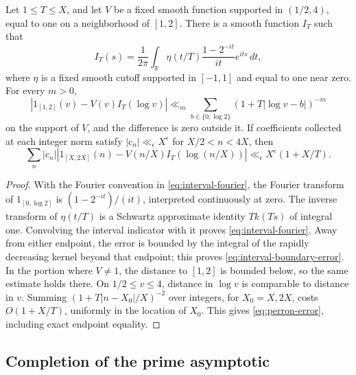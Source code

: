 \begin{lemma}
\label{lem:perron-truncation}
Let \(1\le T\le X\), and let \(V\) be a fixed smooth function
supported in \((1/2,4)\), equal to one on a neighborhood of \([1,2]\).
There is a smooth function \(I_T\) such that
\begin{equation}
 I_T(s)=\frac1{2\pi}\int_{\mathbb R}
       \eta(t/T)\frac{1-2^{-it}}{it}e^{its}\,dt,
 \label{eq:interval-fourier}
\end{equation}
where \(\eta\) is a fixed smooth cutoff supported in \([-1,1]\)
and equal to one near zero. For every \(m>0\),
\begin{equation}
 \left|1_{[1,2]}(v)-V(v)I_T(\log v)\right|
 \ll_m \sum_{b\in\{0,\log2\}}
             (1+T|\log v-b|)^{-m}
 \label{eq:interval-boundary-error}
\end{equation}
on the support of \(V\), and the difference is zero outside it.
If coefficients collected at each integer norm satisfy
\(|c_n|\ll_\epsilon X^\epsilon\) for \(X/2<n<4X\), then
\begin{equation}
 \sum_n |c_n|\left|1_{[X,2X]}(n)
            -V(n/X)I_T(\log(n/X))\right|
       \ll_\epsilon X^\epsilon(1+X/T).
 \label{eq:perron-error}
\end{equation}
\end{lemma}

\begin{proof}
With the Fourier convention in \eqref{eq:interval-fourier}, the
Fourier transform of \(1_{[0,\log2]}\) is
\((1-2^{-it})/(it)\), interpreted continuously at zero.
The inverse transform of \(\eta(t/T)\) is a Schwartz approximate
identity \(T k(Ts)\) of integral one. Convolving the interval
indicator with it proves \eqref{eq:interval-fourier}.
Away from either endpoint, the error is bounded by the integral of
the rapidly decreasing kernel beyond that endpoint; this proves
\eqref{eq:interval-boundary-error}. In the portion where \(V\ne1\),
the distance to \([1,2]\) is bounded below, so the same estimate
holds there. On \(1/2\le v\le4\), distance in \(\log v\) is
comparable to distance in \(v\). Summing
\((1+T|n-X_0|/X)^{-2}\) over integers, for \(X_0=X,2X\),
costs \(O(1+X/T)\), uniformly in the location of \(X_0\).
This gives \eqref{eq:perron-error}, including exact endpoint equality.
\end{proof}

\subsection{Completion of the prime asymptotic}

